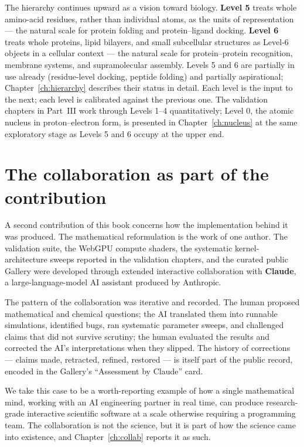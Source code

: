 The hierarchy continues upward as a vision toward biology. \textbf{Level 5} treats whole amino-acid residues, rather than individual atoms, as the units of representation --- the natural scale for protein folding and protein--ligand docking. \textbf{Level 6} treats whole proteins, lipid bilayers, and small subcellular structures as Level-6 objects in a cellular context --- the natural scale for protein--protein recognition, membrane systems, and supramolecular assembly. Levels 5 and 6 are partially in use already (residue-level docking, peptide folding) and partially aspirational; Chapter~\ref{ch:hierarchy} describes their status in detail. Each level is the input to the next; each level is calibrated against the previous one. The validation chapters in Part~III work through Levels 1--4 quantitatively; Level 0, the atomic nucleus in proton--electron form, is presented in Chapter~\ref{ch:nucleus} at the same exploratory stage as Levels 5 and 6 occupy at the upper end.

\section{The collaboration as part of the contribution}

A second contribution of this book concerns how the implementation behind it was produced. The mathematical reformulation is the work of one author. The validation suite, the WebGPU compute shaders, the systematic kernel-architecture sweeps reported in the validation chapters, and the curated public Gallery were developed through extended interactive collaboration with \textbf{Claude}, a large-language-model AI assistant produced by Anthropic.

The pattern of the collaboration was iterative and recorded. The human proposed mathematical and chemical questions; the AI translated them into runnable simulations, identified bugs, ran systematic parameter sweeps, and challenged claims that did not survive scrutiny; the human evaluated the results and corrected the AI's interpretations when they slipped. The history of corrections --- claims made, retracted, refined, restored --- is itself part of the public record, encoded in the Gallery's ``Assessment by Claude'' card.

We take this case to be a worth-reporting example of how a single mathematical mind, working with an AI engineering partner in real time, can produce research-grade interactive scientific software at a scale otherwise requiring a programming team. The collaboration is not the science, but it is part of how the science came into existence, and Chapter~\ref{ch:collab} reports it as such.

